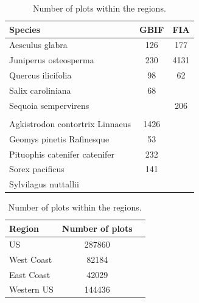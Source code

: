 \begin{table}
    \begin{minipage}{.5\linewidth}
      
      \centering
        \begin{tabular}{lcc}
            \toprule
            Species & GBIF & FIA \\
            \midrule
Aesculus glabra & 126 & 177 \\
Juniperus osteosperma & 230 & 4131\\
Quercus ilicifolia & 98 & 62 \\
Salix caroliniana &  68 & \\ 
Sequoia sempervirens &  & 206 \\
\\
Agkistrodon contortrix Linnaeus & 1426 & \\
Geomys pinetis Rafinesque & 53 & \\
Pituophis catenifer catenifer & 232 & \\
Sorex pacificus  & 141 & \\
Sylvilagus nuttallii & & \\
            \bottomrule
        \end{tabular}
        \caption{\label{table:NrObs}Number of occurrence observations.}
    \end{minipage}%
    \qquad
    \begin{minipage}{.5\linewidth}
      \centering
        \begin{tabular}{lcc}
        \toprule
        Region & Number of plots \\
        \midrule
            US & 287860 \\
            West Coast &  82184 \\
            East Coast &  42029 \\
            Western US &  144436 \\
            \bottomrule
        \end{tabular}
        \caption{\label{table:PlotsRegion}Number of plots within the regions.}
    \end{minipage} 
\end{table}




